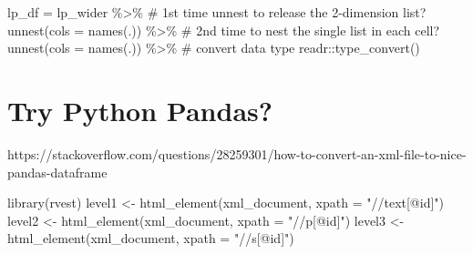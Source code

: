 \documentclass[
  letterpaper,
]{scrbook}
\newenvironment{Shaded}{\begin{snugshade}}{\end{snugshade}}
\newcommand{\AttributeTok}[1]{\textcolor[rgb]{0.40,0.45,0.13}{#1}}
\newcommand{\CommentTok}[1]{\textcolor[rgb]{0.37,0.37,0.37}{#1}}
\newcommand{\FunctionTok}[1]{\textcolor[rgb]{0.28,0.35,0.67}{#1}}
\newcommand{\NormalTok}[1]{\textcolor[rgb]{0.00,0.23,0.31}{#1}}
\newcommand{\OtherTok}[1]{\textcolor[rgb]{0.00,0.23,0.31}{#1}}
\newcommand{\SpecialCharTok}[1]{\textcolor[rgb]{0.37,0.37,0.37}{#1}}
\newcommand{\StringTok}[1]{\textcolor[rgb]{0.13,0.47,0.30}{#1}}
\begin{document}
\begin{Shaded}
\begin{Highlighting}[]
\NormalTok{lp\_df }\OtherTok{=}\NormalTok{ lp\_wider }\SpecialCharTok{\%\textgreater{}\%}
  \CommentTok{\# 1st time unnest to release the 2{-}dimension list?}
  \FunctionTok{unnest}\NormalTok{(}\AttributeTok{cols =} \FunctionTok{names}\NormalTok{(.)) }\SpecialCharTok{\%\textgreater{}\%}
  \CommentTok{\# 2nd time to nest the single list in each cell?}
  \FunctionTok{unnest}\NormalTok{(}\AttributeTok{cols =} \FunctionTok{names}\NormalTok{(.)) }\SpecialCharTok{\%\textgreater{}\%}
  \CommentTok{\# convert data type}
\NormalTok{  readr}\SpecialCharTok{::}\FunctionTok{type\_convert}\NormalTok{()}
\end{Highlighting}
\end{Shaded}

\hypertarget{try-python-pandas}{%
\section{Try Python Pandas?}\label{try-python-pandas}}

https://stackoverflow.com/questions/28259301/how-to-convert-an-xml-file-to-nice-pandas-dataframe

\begin{Shaded}
\begin{Highlighting}[]
\FunctionTok{library}\NormalTok{(rvest)}
\NormalTok{level1 }\OtherTok{\textless{}{-}} \FunctionTok{html\_element}\NormalTok{(xml\_document, }\AttributeTok{xpath =} \StringTok{"//text[@id]"}\NormalTok{)}
\NormalTok{level2 }\OtherTok{\textless{}{-}} \FunctionTok{html\_element}\NormalTok{(xml\_document, }\AttributeTok{xpath =} \StringTok{"//p[@id]"}\NormalTok{)}
\NormalTok{level3 }\OtherTok{\textless{}{-}} \FunctionTok{html\_element}\NormalTok{(xml\_document, }\AttributeTok{xpath =} \StringTok{"//s[@id]"}\NormalTok{)}
\end{Highlighting}
\end{Shaded}
\end{document}
